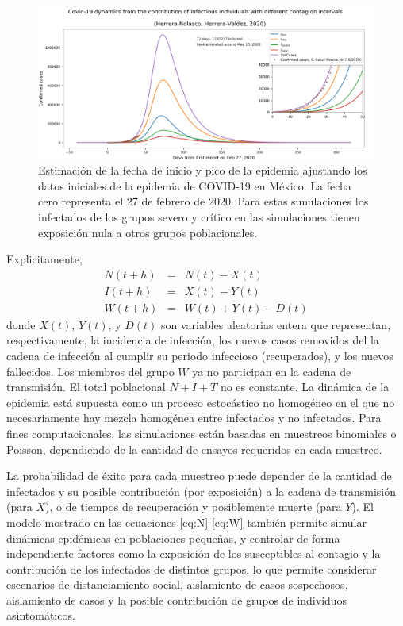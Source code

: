 \begin{figure}[h]
\includegraphics[width=\textwidth]{figures/Covid19_Mexico_InitialFit_Herrera-Valdez+Herrera-Nolasco_2020}
\caption{Estimación de la fecha de inicio y pico de la epidemia ajustando los datos iniciales de la epidemia de COVID-19 en México. La fecha cero representa el 27 de febrero de 2020. Para estas simulaciones los infectados de los grupos severo y crítico en las simulaciones tienen exposición nula a otros grupos poblacionales. } \label{fig:inicioPicoNIW}
\end{figure}

Explicitamente,
\begin{eqnarray}
N(t+h) &=& N(t) - X(t)
 \label{eq:N} \\
I(t+h) &=& X(t) - Y(t)
\label{eq:I}\\
W(t+h) &=& W(t) + Y(t) - D(t)
\label{eq:W}
\end{eqnarray}
donde $X(t)$, $Y(t)$, y $D(t)$ son variables aleatorias entera que representan, respectivamente, la incidencia de infección, los nuevos casos removidos del la cadena de infección al cumplir su periodo infeccioso (recuperados), y los nuevos fallecidos. Los miembros del grupo $W$ ya no participan en la cadena de transmisión. El total poblacional $N+I+T$ no es constante. La dinámica de la epidemia está supuesta como un proceso estocástico no homogéneo en el que no necesariamente hay mezcla homogénea entre infectados y no infectados. Para fines computacionales, las simulaciones están basadas en muestreos binomiales o Poisson, dependiendo de la cantidad de ensayos requeridos en cada muestreo.

 La probabilidad de éxito para cada muestreo puede depender de la cantidad de infectados y su posible contribución (por exposición) a la cadena de transmisión (para $X$), o de tiempos de recuperación y posiblemente muerte (para $Y$). El modelo mostrado en las ecuaciones \eqref{eq:N}-\eqref{eq:W} también permite simular dinámicas epidémicas en poblaciones pequeñas, y controlar de forma independiente  factores como la exposición de los susceptibles al contagio y la contribución de los infectados de distintos grupos, lo que permite considerar escenarios de distanciamiento social, aislamiento de casos sospechosos, aislamiento de casos y la posible contribución de grupos de individuos asintomáticos.



